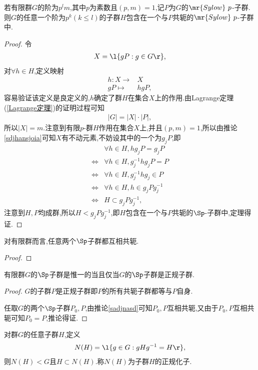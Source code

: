 \begin{theorem}[Sylow第二定理]\label{xldedl}
    若有限群$G$的阶为$p^lm$,其中$p$为素数且$(p,m)=1$,记$P$为$G$的$\mr{Sylow}\ p$-子群.则$G$的任意一个阶为$p^k(k\leq l)$的子群$H$包含在一个与$P$共轭的$\mr{Sylow}\ p$-子群中.
\end{theorem}
\begin{proof}
    令\begin{align*}
        X=\l\{gP:g\in G\r\},
    \end{align*}对$\forall h\in H$,定义映射\begin{align*}
        h:X\to&X\\
        gP\mapsto&hgP,
    \end{align*}容易验证该定义是良定义的,$h$确定了群$H$在集合$X$上的作用.由Lagrange定理(\ref{Lagrange定理})的证明过程可知\begin{align*}
        |G|=|X|\cdot|P|,
    \end{align*}所以$|X|=m$.注意到有限$p$-群$H$作用在集合$X$上,并且$(p,m)=1$,所以由推论\ref{sdjhansjoia}可知$X$有不动元素,不妨设其中的一个为$g_jP$,即\begin{align*}
        &\forall h\in H,hg_jP=g_jP\\
        \iff&\forall h\in H,g_j^{-1}hg_jP=P\\
        \iff&\forall h\in H,g_j^{-1}hg_j\in P\\
        \iff&\forall h\in H,h\in g_jPg_j^{-1}\\
        \iff&H\subset g_jPg_j^{-1},
    \end{align*}注意到$H,P$均成群,所以$H<g_jPg_j^{-1}$,即$H$包含在一个与$P$共轭的$\Sp$-子群中,定理得证.
\end{proof}
\begin{corollary}\label{sadjnasd}
    对有限群而言,任意两个$\Sp$子群都互相共轭.
\end{corollary}
\begin{proof}
    \stars
\end{proof}
\begin{corollary}\label{asdinfjkasdfmk}
    有限群$G$的$\Sp$子群是惟一的当且仅当$G$的$\Sp$子群是正规子群.
\end{corollary}
\begin{proof}
    $G$的子群$P$是正规子群即$P$的所有共轭子群都等与$P$自身.

    任取$G$的两个$\Sp$子群$P_0,P$,由推论\ref{sadjnasd}可知$P_0,P$互相共轭,又由于$P_0,P$互相共轭可知$P_0=P$,推论得证.
\end{proof}
\begin{definition}[正规化子]\label{zghz}
    对群$G$的任意子群$H$,定义\begin{align*}
        N(H)=\l\{g\in G:gHg^{-1}=H\r\},
    \end{align*}则$N(H)<G$且$H\subset N(H)$.称$N(H)$为子群$H$的正规化子.
\end{definition}
